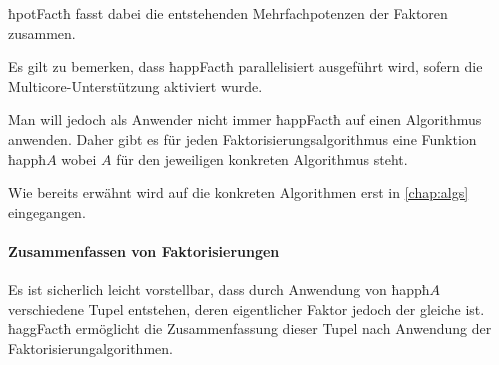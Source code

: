 
ħpotFactħ fasst dabei die entstehenden Mehrfachpotenzen der Faktoren zusammen.


Es gilt zu bemerken, dass ħappFactħ parallelisiert ausgeführt wird, sofern die
Multicore-Unterstützung aktiviert wurde.

Man will jedoch als Anwender nicht immer ħappFactħ auf einen Algorithmus
anwenden. Daher gibt es für jeden Faktorisierungsalgorithmus eine Funktion 
ħappħ$A$ wobei $A$ für den jeweiligen konkreten Algorithmus steht.



Wie bereits erwähnt wird auf die konkreten Algorithmen erst in
\autoref{chap:algs} eingegangen.

\paragraph{Zusammenfassen von Faktorisierungen} Es ist sicherlich leicht
vorstellbar, dass durch Anwendung von ħappħ$A$ verschiedene Tupel entstehen,
deren eigentlicher Faktor jedoch der gleiche ist. 
ħaggFactħ ermöglicht die Zusammenfassung dieser Tupel nach Anwendung der 
Faktorisierungalgorithmen.


